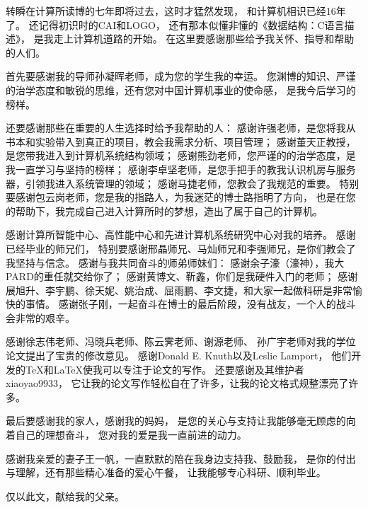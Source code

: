 
\begin{ack}

转瞬在计算所读博的七年即将过去，这时才猛然发现，
和计算机相识已经16年了。
还记得初识时的CAI和LOGO，
还有那本似懂非懂的《数据结构：C语言描述》，
是我走上计算机道路的开始。
在这里要感谢那些给予我关怀、指导和帮助的人们。

首先要感谢我的导师孙凝晖老师，成为您的学生我的幸运。
您渊博的知识、严谨的治学态度和敏锐的思维，还有您对中国计算机事业的使命感，
是我今后学习的榜样。

还要感谢那些在重要的人生选择时给予我帮助的人：
感谢许强老师，是您将我从书本和实验带入到真正的项目，教会我需求分析、项目管理；
感谢董天正教授，是您带我进入到计算机系统结构领域；
感谢熊劲老师，您严谨的的治学态度，是我一直学习与坚持的榜样；
感谢李卓坚老师，是您手把手的教我认识机房与服务器，引领我进入系统管理的领域；
感谢马捷老师，您教会了我规范的重要。
特别要感谢包云岗老师，您是我的指路人，为我迷茫的博士路指明了方向，
也是在您的帮助下，我完成自己进入计算所时的梦想，造出了属于自己的计算机。

感谢计算所智能中心、高性能中心和先进计算机系统研究中心对我的培养。
感谢已经毕业的师兄们，
特别要感谢邢晶师兄、马灿师兄和李强师兄，是你们教会了我坚持与信念。
感谢与我共同奋斗的师弟师妹们：
感谢余子濠（濠神），我大PARD的重任就交给你了；
感谢黄博文、靳鑫，你们是我硬件入门的老师；
感谢展旭升、李宇鹏、徐天妮、姚治成、屈雨鹏、李文捷，和大家一起做科研是非常愉快的事情。
感谢张子刚，一起奋斗在博士的最后阶段，没有战友，一个人的战斗会非常的艰辛。

感谢徐志伟老师、冯晓兵老师、陈云霁老师、谢源老师、
孙广宇老师对我的学位论文提出了宝贵的修改意见。
感谢Donald E. Knuth以及Leslie Lamport，
他们开发的\TeX 和\LaTeX 使我可以专注于论文的写作。
还要感谢\ucasthesis 及其维护者xiaoyao9933，
它让我的论文写作轻松自在了许多，让我的论文格式规整漂亮了许多。

最后要感谢我的家人，感谢我的妈妈，
是您的关心与支持让我能够毫无顾虑的向着自己的理想奋斗，
您对我的爱是我一直前进的动力。

感谢我亲爱的妻子王一帆，一直默默的陪在我身边支持我、鼓励我，
是你的付出与理解，还有那些精心准备的爱心午餐，
让我能够专心科研、顺利毕业。

仅以此文，献给我的父亲。
\newline\newline


\end{ack}

